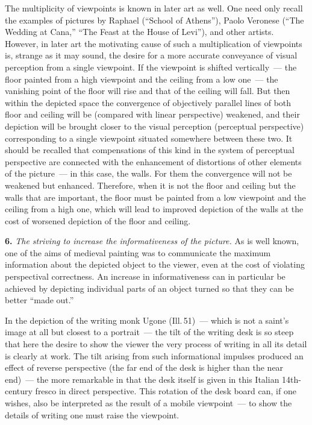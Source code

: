 The multiplicity of viewpoints is known in later art as well.  One need only recall
the examples of pictures by Raphael (``School of Athens''), Paolo Veronese (``The
Wedding at Cana,'' ``The Feast at the House of Levi''), and other artists.  However,
in later art the motivating cause of such a multiplication of viewpoints is, strange
as it may sound, the desire for a more accurate conveyance of visual perception from
a single viewpoint.  If the viewpoint is shifted vertically~--- the floor painted from
a high viewpoint and the ceiling from a low one~--- the vanishing point of the floor
will rise and that of the ceiling will fall.  But then within the depicted space the
convergence of objectively parallel lines of both floor and ceiling will be (compared
with linear perspective) weakened, and their depiction will be brought closer to the
visual perception (perceptual perspective) corresponding to a single viewpoint
situated somewhere between these two.  It should be recalled that compensations of
this kind in the system of perceptual perspective are connected with the enhancement
of distortions of other elements of the picture~--- in this case, the walls.  For
them the convergence will not be weakened but enhanced.  Therefore, when it is not the
floor and ceiling but the walls that are important, the floor must be painted from a
low viewpoint and the ceiling from a high one, which will lead to improved depiction
of the walls at the cost of worsened depiction of the floor and ceiling.

\medskip
\noindent\textbf{6.}\quad
\emph{The striving to increase the informativeness of the picture.}  As is well
known, one of the aims of medieval painting was to communicate the maximum information
about the depicted object to the viewer, even at the cost of violating perspectival
correctness.  An increase in informativeness can in particular be achieved by
depicting individual parts of an object turned so that they can be better ``made
out.''


In the depiction of the writing monk Ugone (Ill.\,51)~--- which is not a saint's
image at all but closest to a portrait~--- the tilt of the writing desk is so steep
that here the desire to show the viewer the very process of writing in all its detail
is clearly at work.  The tilt arising from such informational impulses produced an
effect of reverse perspective (the far end of the desk is higher than the near end)~---
the more remarkable in that the desk itself is given in this Italian 14th-century
fresco in direct perspective.  This rotation of the desk board can, if one wishes,
also be interpreted as the result of a mobile viewpoint~--- to show the details of
writing one must raise the viewpoint.

